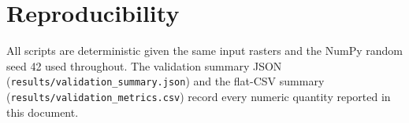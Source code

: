 \documentclass[12pt,a4paper]{article}
\begin{document}
\section{Reproducibility}

All scripts are deterministic given the same input rasters and the
NumPy random seed 42 used throughout. The validation summary JSON
(\texttt{results/validation\_summary.json}) and the flat-CSV summary
(\texttt{results/validation\_metrics.csv}) record every numeric
quantity reported in this document.
\end{document}

